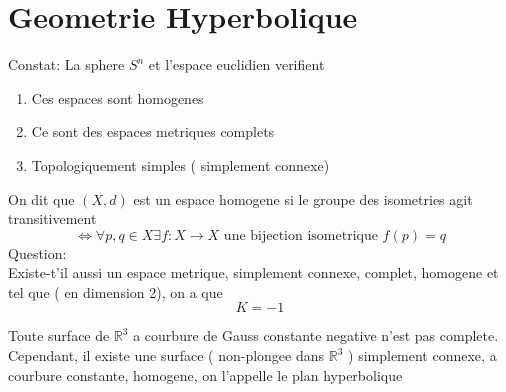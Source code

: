 \documentclass[../main.tex]{subfiles}
\begin{document}
\section{Geometrie Hyperbolique}
Constat: La sphere $S^{n}$ et l'espace euclidien verifient 
\begin{enumerate}
\item Ces espaces sont homogenes
\item Ce sont des espaces metriques complets
\item Topologiquement simples ( simplement connexe) 
\end{enumerate}
On dit que $( X,d) $ est un espace homogene si le groupe des isometries agit transitivement 
\[ 
\iff \forall p,q \in X \exists f:X\to X \text{ une bijection isometrique } f( p) = q
\]
Question:\\
Existe-t'il aussi un espace metrique, simplement connexe, complet, homogene et tel que ( en dimension 2), on a que
\[ 
K = -1
\]
\begin{thm}[Hilbert]
	Toute surface de $ \mathbb{R}^{3}$ a courbure de Gauss constante negative n'est pas complete.\\
	Cependant, il existe une surface ( non-plongee dans $ \mathbb{R}^{3}$ ) simplement connexe, a courbure constante, homogene, on l'appelle le plan hyperbolique
\end{thm}
\end{document}
